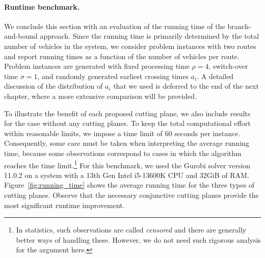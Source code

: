 \documentclass[a4paper]{report}
\theoremstyle{definition}
\theoremstyle{plain}
\newcommand\note[1]{{\color{Navy}#1}}
\begin{document}
\paragraph{Runtime benchmark.}

We conclude this section with an evaluation of the running time of the
branch-and-bound approach.
%
Since the running time is primarily determined by the total number of vehicles
in the system, we consider problem instances with two routes and report
running times as a function of the number of vehicles per route.
%
Problem instances are generated with fixed processing time $\rho=4$, switch-over
time $\sigma=1$, and randomly generated earliest crossing times $a_i$.
%
A detailed discussion of the distribution of $a_i$ that we used is deferred to
the end of the next chapter, where a more extensive comparison will be provided.

\note{To illustrate the benefit of each proposed cutting plane, we also include
results for the case without any cutting planes.}
%
To keep the total computational effort within reasonable limits, we impose a
time limit of 60 seconds per instance.
%
Consequently, some care must be taken when interpreting the average running
time, because some observations correspond to cases in which the algorithm
reaches the time limit.\footnote{In statistics, such observations are called \emph{censored}
  and there are generally better ways of handling these. However, we do not need
  such rigorous analysis for the argument here.} For this benchmark, we used
the Gurobi solver version 11.0.2 on a system with a 13th Gen Intel i5-13600K CPU
and 32GiB of RAM.
%
Figure~\ref{fig:running_time} shows the average running time for the three types of cutting planes.
Observe that the necessary conjunctive cutting planes provide the most
significant runtime improvement.
\end{document}
